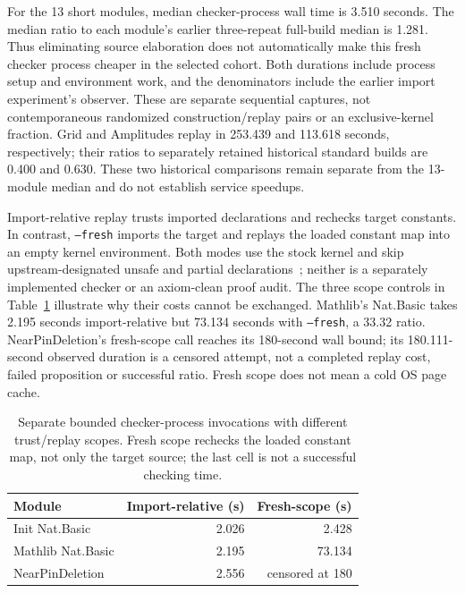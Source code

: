 \documentclass[10pt,twocolumn]{article}
\begin{document}
For the 13 short modules, median checker-process wall time is 3.510 seconds.
The median ratio to each module's earlier three-repeat full-build median
is 1.281. Thus eliminating source elaboration does not automatically
make this fresh checker process cheaper in the selected cohort.
Both durations include process setup and environment work, and the
denominators include the earlier import experiment's observer.
These are separate sequential captures, not contemporaneous randomized
construction/replay pairs or an exclusive-kernel fraction.
Grid and Amplitudes replay in 253.439 and 113.618 seconds, respectively;
their ratios to separately retained historical standard builds are
0.400 and 0.630. These two historical comparisons remain separate from
the 13-module median and do not establish service speedups.

Import-relative replay trusts imported declarations and rechecks target
constants. In contrast, \texttt{--fresh} imports the target and replays
the loaded constant map into an empty kernel environment.
Both modes use the stock kernel and skip upstream-designated unsafe and
partial declarations~\cite{leanCheckerDocs}; neither is a separately
implemented checker or an axiom-clean proof audit.
The three scope controls in Table~\ref{tab:replay-scope} illustrate why
their costs cannot be exchanged.
Mathlib's Nat.Basic takes 2.195 seconds import-relative but 73.134 seconds
with \texttt{--fresh}, a 33.32 ratio.
NearPinDeletion's fresh-scope call reaches its 180-second wall bound;
its 180.111-second observed duration is a censored attempt, not a completed
replay cost, failed proposition or successful ratio.
Fresh scope does not mean a cold OS page cache.

\begin{table}[t]
\centering\small
\begin{tabular}{@{}lrr@{}}
\toprule
Module & Import-relative (s) & Fresh-scope (s)\\
\midrule
Init Nat.Basic & 2.026 & 2.428\\
Mathlib Nat.Basic & 2.195 & 73.134\\
NearPinDeletion & 2.556 & censored at 180\\
\bottomrule
\end{tabular}
\caption{Separate bounded checker-process invocations with different
trust/replay scopes. Fresh scope rechecks the loaded constant map, not
only the target source; the last cell is not a successful checking time.}
\label{tab:replay-scope}
\end{table}
\end{document}
